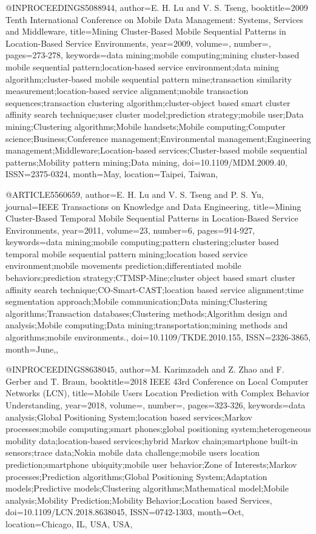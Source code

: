 @INPROCEEDINGS{5088944, 
author={E. H. {Lu} and V. S. {Tseng}}, 
booktitle={2009 Tenth International Conference on Mobile Data Management: Systems, Services and Middleware}, 
title={Mining Cluster-Based Mobile Sequential Patterns in Location-Based Service Environments}, 
year={2009}, 
volume={}, 
number={}, 
pages={273-278}, 
keywords={data mining;mobile computing;mining cluster-based mobile sequential pattern;location-based service environment;data mining algorithm;cluster-based mobile sequential pattern mine;transaction similarity measurement;location-based service alignment;mobile transaction sequences;transaction clustering algorithm;cluster-object based smart cluster affinity search technique;user cluster model;prediction strategy;mobile user;Data mining;Clustering algorithms;Mobile handsets;Mobile computing;Computer science;Business;Conference management;Environmental management;Engineering management;Middleware;Location-based services;Cluster-based mobile sequential patterns;Mobility pattern mining;Data mining}, 
doi={10.1109/MDM.2009.40}, 
ISSN={2375-0324}, 
month={May},
location={Taipei, Taiwan}},



@ARTICLE{5560659, 
author={E. H. {Lu} and V. S. {Tseng} and P. S. {Yu}}, 
journal={IEEE Transactions on Knowledge and Data Engineering}, 
title={Mining Cluster-Based Temporal Mobile Sequential Patterns in Location-Based Service Environments}, 
year={2011}, 
volume={23}, 
number={6}, 
pages={914-927}, 
keywords={data mining;mobile computing;pattern clustering;cluster based temporal mobile sequential pattern mining;location based service environment;mobile movements prediction;differentiated mobile behaviors;prediction strategy;CTMSP-Mine;cluster object based smart cluster affinity search technique;CO-Smart-CAST;location based service alignment;time segmentation approach;Mobile communication;Data mining;Clustering algorithms;Transaction databases;Clustering methods;Algorithm design and analysis;Mobile computing;Data mining;transportation;mining methods and algorithms;mobile environments.},
doi={10.1109/TKDE.2010.155}, 
ISSN={2326-3865}, 
month={June},},

@INPROCEEDINGS{8638045, 
author={M. {Karimzadeh} and Z. {Zhao} and F. {Gerber} and T. {Braun}}, 
booktitle={2018 IEEE 43rd Conference on Local Computer Networks (LCN)}, 
title={Mobile Users Location Prediction with Complex Behavior Understanding}, 
year={2018}, 
volume={}, 
number={}, 
pages={323-326}, 
keywords={data analysis;Global Positioning System;location based services;Markov processes;mobile computing;smart phones;global positioning system;heterogeneous mobility data;location-based services;hybrid Markov chain;smartphone built-in sensors;trace data;Nokia mobile data challenge;mobile users location prediction;smartphone ubiquity;mobile user behavior;Zone of Interests;Markov processes;Prediction algorithms;Global Positioning System;Adaptation models;Predictive models;Clustering algorithms;Mathematical model;Mobile analysis;Mobility Prediction;Mobility Behavior;Location based Services},
doi={10.1109/LCN.2018.8638045}, 
ISSN={0742-1303}, 
month={Oct},
location={Chicago, IL, USA, USA}},


